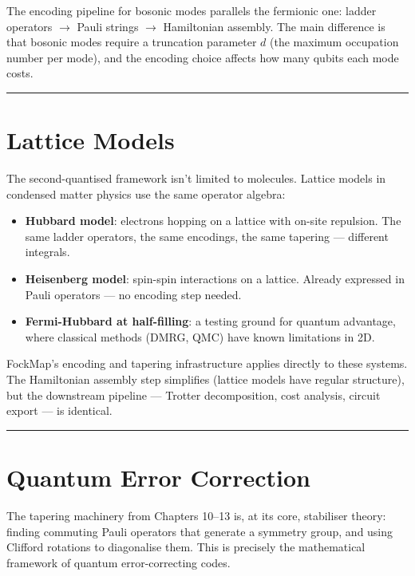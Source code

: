 \documentclass[
  11pt,
  oneside]{book}
\providecommand{\tightlist}{%
  \setlength{\itemsep}{0pt}\setlength{\parskip}{0pt}}
\begin{document}
The encoding pipeline for bosonic modes parallels the fermionic one:
ladder operators $\rightarrow$ Pauli strings $\rightarrow$ Hamiltonian assembly. The main
difference is that bosonic modes require a truncation parameter \(d\)
(the maximum occupation number per mode), and the encoding choice
affects how many qubits each mode costs.

\begin{center}\rule{0.5\linewidth}{0.5pt}\end{center}

\section{Lattice Models}\label{lattice-models}

The second-quantised framework isn't limited to molecules. Lattice
models in condensed matter physics use the same operator algebra:

\begin{itemize}
\tightlist
\item
  \textbf{Hubbard model}: electrons hopping on a lattice with on-site
  repulsion. The same ladder operators, the same encodings, the same
  tapering --- different integrals.
\item
  \textbf{Heisenberg model}: spin-spin interactions on a lattice.
  Already expressed in Pauli operators --- no encoding step needed.
\item
  \textbf{Fermi-Hubbard at half-filling}: a testing ground for quantum
  advantage, where classical methods (DMRG, QMC) have known limitations
  in 2D.
\end{itemize}

FockMap's encoding and tapering infrastructure applies directly to these
systems. The Hamiltonian assembly step simplifies (lattice models have
regular structure), but the downstream pipeline --- Trotter
decomposition, cost analysis, circuit export --- is identical.

\begin{center}\rule{0.5\linewidth}{0.5pt}\end{center}

\section{Quantum Error Correction}\label{quantum-error-correction}

The tapering machinery from Chapters 10--13 is, at its core, stabiliser
theory: finding commuting Pauli operators that generate a symmetry
group, and using Clifford rotations to diagonalise them. This is
precisely the mathematical framework of quantum error-correcting codes.
\end{document}
